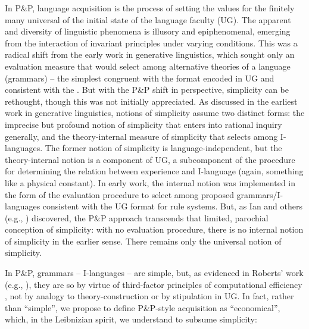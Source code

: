 \documentclass[output=paper]{langsci/langscibook}
\begin{document}
\largerpage
In P\&P, language acquisition is the process of setting the values for the
finitely many universal  of the initial state of the language faculty
(\gls{UG}). The apparent  and diversity of linguistic phenomena is illusory
and epi\-phenomenal, emerging from the interaction of invariant principles under
varying conditions. This was a radical shift from the early work in generative
linguistics, which sought only an evaluation measure that would select among
alternative theories of a language (grammars) – the simplest congruent with the
format encoded in \gls{UG} and consistent with the . But with
the P\&P shift in perspective, simplicity can be rethought, though this was
not initially appreciated. As discussed in the earliest work in generative
linguistics, notions of simplicity assume two distinct forms: the imprecise but
profound notion of simplicity that enters into rational inquiry generally, and
the theory-internal measure of simplicity that selects among I-languages. The
former notion of simplicity is language-independent, but the theory-internal
notion is a component of \gls{UG}, a subcomponent of the procedure for determining
the relation between experience and I-language (again, something like a
physical constant). In early work, the internal notion was implemented in the
form of the evaluation procedure to select among proposed grammars/I-languages
consistent with the \gls{UG} format for rule systems. But, as Ian \citet{Roberts2012}
and others (e.g., \citealt{SheeBibRobHol2017}) discovered, the P\&P approach
transcends that limited, parochial conception of simplicity: with no evaluation
procedure, there is no internal notion of simplicity in the earlier sense.
There remains only the universal notion of simplicity.

In P\&P, grammars – I-languages – are simple, but, as evidenced in Roberts’
work (e.g., \citealt{RobHol2010}), they are so by virtue of
third-factor principles of computational efficiency \citep{Chomsky2005}, not by
analogy to theory-construction or by stipulation in \gls{UG}. In fact, rather than
“simple”, we propose to define P\&P-style acquisition as “economical”, which,
in the Leibnizian spirit, we understand to subsume simplicity:
\end{document}
